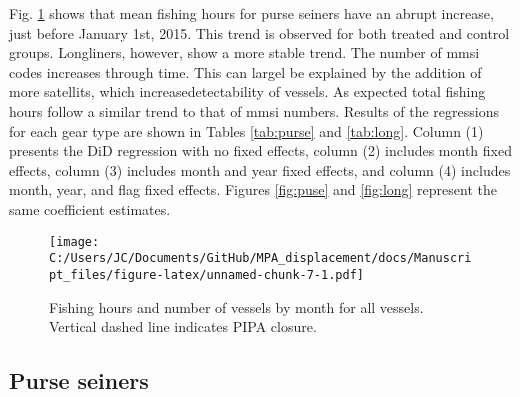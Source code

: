 \documentclass[]{article}
\theoremstyle{definition}
\theoremstyle{definition}
\theoremstyle{definition}
\theoremstyle{remark}
\begin{document}
Fig. \ref{fig:all_vessels} shows that mean fishing hours for purse
seiners have an abrupt increase, just before January 1st, 2015. This
trend is observed for both treated and control groups. Longliners,
however, show a more stable trend. The number of mmsi codes increases
through time. This can largel be explained by the addition of more
satellits, which increasedetectability of vessels. As expected total
fishing hours follow a similar trend to that of mmsi numbers. Results of
the regressions for each gear type are shown in Tables \ref{tab:purse}
and \ref{tab:long}. Column (1) presents the DiD regression with no fixed
effects, column (2) includes month fixed effects, column (3) includes
month and year fixed effects, and column (4) includes month, year, and
flag fixed effects. Figures \ref{fig:puse} and \ref{fig:long} represent
the same coefficient estimates.

\begin{figure}
\centering
\texttt{[image: C:/Users/JC/Documents/GitHub/MPA\_displacement/docs/Manuscript\_files/figure-latex/unnamed-chunk-7-1.pdf]}
\caption{\label{fig:unnamed-chunk-7}\label{fig:all_vessels}Fishing hours and
number of vessels by month for all vessels. Vertical dashed line
indicates PIPA closure.}
\end{figure}

\clearpage

\subsection{Purse seiners}\label{purse-seiners}
\end{document}
